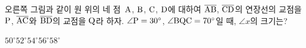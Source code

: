 \noindent\begin{minipage}[t]{0.58\linewidth}\vspace{0pt}\raggedright 오른쪽 그림과 같이 원 위의 네 점~$\mathrm{A}$, $\mathrm{B}$, $\mathrm{C}$, $\mathrm{D}$에 대하여 $\overline{\mathrm{AB}}$, $\overline{\mathrm{CD}}$의 연장선의 교점을 $\mathrm{P}$, $\overline{\mathrm{AC}}$와 $\overline{\mathrm{BD}}$의 교점을 $\mathrm{Q}$라 하자. $\angle\mathrm{P}=30^\circ$, $\angle\mathrm{BQC}=70^\circ$일 때, $\angle x$의 크기는?\end{minipage}\hfill\begin{minipage}[t]{0.4\linewidth}\vspace{0pt}\centering \resizebox{\ifdim\width>\linewidth\linewidth\else\width\fi}{!}{}\end{minipage}\par
\begin{choicesii}{$50^\circ$}{$52^\circ$}{$54^\circ$}{$56^\circ$}{$58^\circ$}\end{choicesii}
